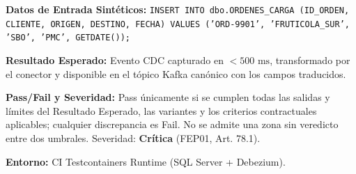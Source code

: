 \par\noindent\textbf{Datos de Entrada Sintéticos:} \texttt{I\allowbreak{}N\allowbreak{}S\allowbreak{}E\allowbreak{}R\allowbreak{}T\allowbreak{} I\allowbreak{}N\allowbreak{}T\allowbreak{}O\allowbreak{} d\allowbreak{}b\allowbreak{}o\allowbreak{}.\allowbreak{}O\allowbreak{}R\allowbreak{}D\allowbreak{}E\allowbreak{}N\allowbreak{}E\allowbreak{}S\allowbreak{}\_\allowbreak{}C\allowbreak{}A\allowbreak{}R\allowbreak{}G\allowbreak{}A\allowbreak{} (\allowbreak{}I\allowbreak{}D\allowbreak{}\_\allowbreak{}O\allowbreak{}R\allowbreak{}D\allowbreak{}E\allowbreak{}N\allowbreak{},\allowbreak{} C\allowbreak{}L\allowbreak{}I\allowbreak{}E\allowbreak{}N\allowbreak{}T\allowbreak{}E\allowbreak{},\allowbreak{} O\allowbreak{}R\allowbreak{}I\allowbreak{}G\allowbreak{}E\allowbreak{}N\allowbreak{},\allowbreak{} D\allowbreak{}E\allowbreak{}S\allowbreak{}T\allowbreak{}I\allowbreak{}N\allowbreak{}O\allowbreak{},\allowbreak{} F\allowbreak{}E\allowbreak{}C\allowbreak{}H\allowbreak{}A\allowbreak{})\allowbreak{} V\allowbreak{}A\allowbreak{}L\allowbreak{}U\allowbreak{}E\allowbreak{}S\allowbreak{} (\allowbreak{}'\allowbreak{}O\allowbreak{}R\allowbreak{}D\allowbreak{}-\allowbreak{}9\allowbreak{}9\allowbreak{}0\allowbreak{}1\allowbreak{}'\allowbreak{},\allowbreak{} '\allowbreak{}F\allowbreak{}R\allowbreak{}U\allowbreak{}T\allowbreak{}I\allowbreak{}C\allowbreak{}O\allowbreak{}L\allowbreak{}A\allowbreak{}\_\allowbreak{}S\allowbreak{}U\allowbreak{}R\allowbreak{}'\allowbreak{},\allowbreak{} '\allowbreak{}S\allowbreak{}B\allowbreak{}O\allowbreak{}'\allowbreak{},\allowbreak{} '\allowbreak{}P\allowbreak{}M\allowbreak{}C\allowbreak{}'\allowbreak{},\allowbreak{} G\allowbreak{}E\allowbreak{}T\allowbreak{}D\allowbreak{}A\allowbreak{}T\allowbreak{}E\allowbreak{}(\allowbreak{})\allowbreak{})\allowbreak{};\allowbreak{}}\par
\par\noindent\textbf{Resultado Esperado:} Evento CDC capturado en \(< 500\text{ ms}\), transformado por el conector y disponible en el tópico Kafka canónico con los campos traducidos.\par
\par\noindent\textbf{Pass/Fail y Severidad:} Pass únicamente si se cumplen todas las salidas y límites del Resultado Esperado, las variantes y los criterios contractuales aplicables; cualquier discrepancia es Fail. No se admite una zona sin veredicto entre dos umbrales. Severidad: \textbf{Crítica} (FEP01, Art. 78.1).\par
\par\noindent\textbf{Entorno:} CI Testcontainers Runtime (SQL Server + Debezium).\par







